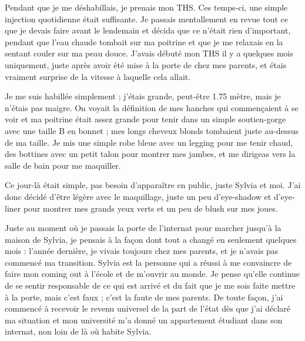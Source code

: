 \documentclass[12pt,hidelinks,a4paper]{book}
\begin{document}
\bigskip
Pendant que je me déshabillais, je prenais mon THS. Ces temps-ci,
une simple injection quotidienne était suffisante. Je passais mentallement
en revue tout ce que je devais faire avant le lendemain et décida
que ce n'était rien d'important, pendant que l'eau chaude tombait
sur ma poitrine et que je me relaxais en la sentant couler sur ma
peau douce. J'avais débuté mon THS il y a quelques mois uniquement,
juste après avoir été mise à la porte de chez mes parents, et étais
vraiment surprise de la vitesse à laquelle cela allait.\par 

\bigskip

Je me suis habillée simplement ; j'étais grande, peut-être 1.75 mètre,
mais je n'étais pas maigre. On voyait la définition de mes hanches
qui commençaient à se voir et ma poitrine était assez grande pour
tenir dans un simple soutien-gorge avec une taille B en bonnet ; mes
longs cheveux blonds tombaient juste au-dessus de ma taille. Je mis
une simple robe bleue avec un legging pour me tenir chaud, des bottines
avec un petit talon pour montrer mes jambes, et me dirigeas vers la
salle de bain pour me maquiller.\par

\bigskip

Ce jour-là était simple, pas besoin d'apparaître en public, juste
Sylvia et moi. J'ai donc décidé d'être légère avec le maquillage,
juste un peu d'eye-shadow et d'eye-liner pour montrer mes grands yeux
verts et un peu de blush sur mes joues.\par

\bigskip

Juste au moment où je passais la porte de l'internat pour marcher
jusqu'à la maison de Sylvia, je pensais à la façon dont tout a changé
en seulement quelques mois : l'année dernière, je vivais toujours
chez mes parents, et je n'avais pas commencé ma transition. Sylvia
est la personne qui a réussi à me convaincre de faire mon coming out
à l'école et de m'ouvrir au monde. Je pense qu'elle continue de se
sentir responsable de ce qui est arrivé et du fait que je me sois
faite mettre à la porte, mais c'est faux ; c'est la faute de mes parents.
De toute façon, j'ai commencé à recevoir le revenu universel de la
part de l'état dès que j'ai déclaré ma situation et mon université
m'a donné un appartement étudiant dans son internat, non loin de là
où habite Sylvia.\par

\bigskip
\end{document}
